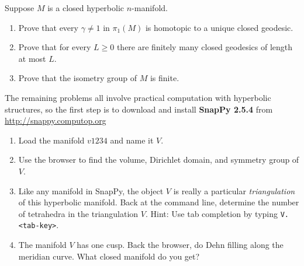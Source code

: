 \documentclass[tikz, a4paper]{nmd/hw}
\begin{document}
\begin{problems}
\item Suppose $M$ is a closed hyperbolic $n$-manifold.
  \begin{enumerate}
  \item Prove that every $\gamma \neq 1$ in $\pi_1(M)$ is homotopic to
    a unique closed geodesic.
    
  \item Prove that for every $L \geq 0$ there are finitely many closed
    geodesics of length at most $L$.

  \item Prove that the isometry group of $M$ is finite.
  \end{enumerate}

\item The remaining problems all involve practical computation with
  hyperbolic structures, so the first step is to download and install
  \textbf{SnapPy 2.5.4} from \url{http://snappy.computop.org}

\item \begin{enumerate}
  \item Load the manifold $v1234$ and name it $V$.  
  \item Use the browser to find the volume, Dirichlet domain, and
    symmetry group of $V$.
  \item Like any manifold in SnapPy, the object $V$ is really a
    particular \emph{triangulation} of this hyperbolic manifold.
    Back at the command line, determine the number of tetrahedra
    in the triangulation $V$.  Hint: Use tab completion by
    typing \texttt{V.<tab-key>}.  
  \item The manifold $V$ has one cusp.  Back the browser, do Dehn
    filling along the meridian curve.  What closed manifold do you get?  
  \end{enumerate}
  

\end{problems}
\end{document}

